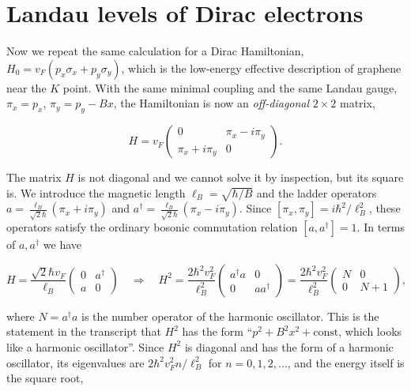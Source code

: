 

\section{Landau levels of Dirac electrons}

Now we repeat the same calculation for a Dirac Hamiltonian, $H_0 = v_F(p_x\sigma_x+p_y\sigma_y)$,
which is the low-energy effective description of graphene near the $K$ point. With the same
minimal coupling and the same Landau gauge, $\pi_x=p_x$, $\pi_y=p_y-Bx$, the Hamiltonian is now an
\emph{off-diagonal} $2\times2$ matrix,

\begin{equation*}
H = v_F\begin{pmatrix}0 & \pi_x-i\pi_y\\ \pi_x+i\pi_y & 0\end{pmatrix}.
\end{equation*}

The matrix $H$ is not diagonal and we cannot solve it by inspection, but its square is. We
introduce the magnetic length $\ell_B=\sqrt{\hbar/B}$ and the ladder operators $a =
\frac{\ell_B}{\sqrt{2}\hbar}(\pi_x+i\pi_y)$ and
$a^\dagger=\frac{\ell_B}{\sqrt{2}\hbar}(\pi_x-i\pi_y)$. Since $[\pi_x,\pi_y]=i\hbar^2/\ell_B^2$,
these operators satisfy the ordinary bosonic commutation relation $[a,a^\dagger]=1$. In terms of
$a,a^\dagger$ we have

\begin{equation*}
H = \frac{\sqrt{2}\hbar v_F}{\ell_B}\begin{pmatrix}0 & a^\dagger\\ a & 0\end{pmatrix}
\quad\Longrightarrow\quad
H^2 = \frac{2\hbar^2v_F^2}{\ell_B^2}\begin{pmatrix}a^\dagger a & 0\\ 0 & aa^\dagger\end{pmatrix}
= \frac{2\hbar^2v_F^2}{\ell_B^2}\begin{pmatrix}N & 0\\ 0 & N+1\end{pmatrix},
\end{equation*}

where $N=a^\dagger a$ is the number operator of the harmonic oscillator. This is the statement in
the transcript that $H^2$ has the form ``$p^2+B^2x^2+\text{const}$, which looks like a harmonic
oscillator''. Since $H^2$ is diagonal and has the form of a harmonic oscillator, its eigenvalues
are $2\hbar^2v_F^2 n/\ell_B^2$ for $n=0,1,2,\dots$, and the energy itself is the square root,

